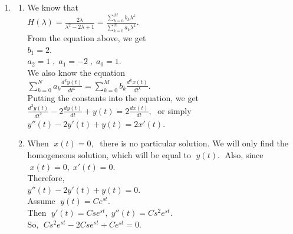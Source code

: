 \documentclass[10pt,a4paper, margin=1in]{article}
\begin{document}
\begin{enumerate}
\item %
    \begin{enumerate}   
    \item %
    We know that\vspace{0.3cm}\\
    $H(\lambda) = \frac{2\lambda}{\lambda^2-2\lambda+1} = \frac{\sum_{k=0}^M b_k\lambda^k}{\sum_{k=0}^N a_k\lambda^k}.$\vspace{0.3cm}\\
    From the equation above, we get\vspace{0.3cm}\\
    $b_1 = 2$.\\
    $a_2=1 \;,\; a_1=-2 \;,\; a_0=1.$\vspace{0.3cm}\\
    We also know the equation\vspace{0.3cm}\\
    $\sum_{k=0}^N a_k\frac{d^ky(t)}{dt^k} = \sum_{k=0}^M b_k\frac{d^kx(t)}{dt^k}$.\vspace{0.3cm}\\
    Putting the constants into the equation, we get\vspace{0.3cm}\\
    $\frac{d^2y(t)}{dt^2} - 2\frac{dy(t)}{dt} + y(t) = 2\frac{dx(t)}{dt}, \;$ or simply\vspace{0.3cm}\\
    $y''(t) - 2y'(t) + y(t) = 2x'(t).$\vspace{0.3cm}\\
    \item %
    When $\; x(t) = 0, \;$ there is no particular solution. We will only find the homogeneous solution, which will be equal to $\; y(t). \;$ Also, since $\; x(t)=0, \; x'(t)=0. \;$\vspace{0.3cm}\\
    Therefore,\vspace{0.3cm}\\
    $y''(t) - 2y'(t) + y(t) = 0.$\vspace{0.3cm}\\
    Assume $\; y(t) = Ce^{st}.$\vspace{0.3cm}\\
    Then $\; y'(t) = Cse^{st},\; y''(t) = Cs^2e^{st}.\;$\vspace{0.3cm}\\
    So, $\; Cs^2e^{st} - 2Cse^{st} + Ce^{st} = 0.$\vspace{0.3cm}\\

\end{enumerate}
\end{enumerate}
\end{document}
